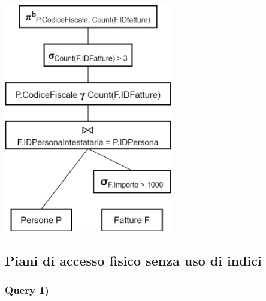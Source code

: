 \documentclass[a4paper,12pt]{article}
\begin{document}
\begin{minipage}{\textwidth}
\begin{multicols}{2}

\null \vfill

\vfill \null

\columnbreak

\includegraphics[height=10cm]{ Albero logico 3.png }
\end{multicols}
\end{minipage}

 \subsection{ Piani di accesso fisico senza uso di indici }

 \subsubsection{ Query 1) }
\end{document}
